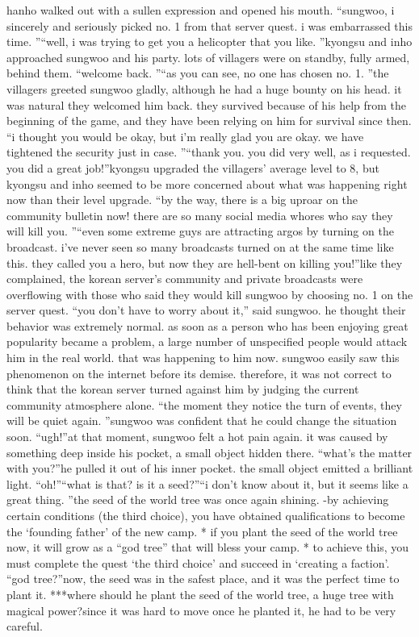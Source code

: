 hanho walked out with a sullen expression and opened his mouth.
“sungwoo, i sincerely and seriously picked no.
 1 from that server quest.
 i was embarrassed this time.
”“well, i was trying to get you a helicopter that you like.
”kyongsu and inho approached sungwoo and his party.
lots of villagers were on standby, fully armed, behind them.
“welcome back.
”“as you can see, no one has chosen no.
 1.
”the villagers greeted sungwoo gladly, although he had a huge bounty on his head.
 it was natural they welcomed him back.
 they survived because of his help from the beginning of the game, and they have been relying on him for survival since then.
“i thought you would be okay, but i’m really glad you are okay.
 we have tightened the security just in case.
”“thank you.
 you did very well, as i requested.
 you did a great job!”kyongsu upgraded the villagers’ average level to 8, but kyongsu and inho seemed to be more concerned about what was happening right now than their level upgrade.
“by the way, there is a big uproar on the community bulletin now! there are so many social media whores who say they will kill you.
”“even some extreme guys are attracting argos by turning on the broadcast.
 i’ve never seen so many broadcasts turned on at the same time like this.
 they called you a hero, but now they are hell-bent on killing you!”like they complained, the korean server’s community and private broadcasts were overflowing with those who said they would kill sungwoo by choosing no.
 1 on the server quest.
“you don’t have to worry about it,” said sungwoo.
he thought their behavior was extremely normal.
 as soon as a person who has been enjoying great popularity became a problem, a large number of unspecified people would attack him in the real world.
 that was happening to him now.
sungwoo easily saw this phenomenon on the internet before its demise.
 therefore, it was not correct to think that the korean server turned against him by judging the current community atmosphere alone.
“the moment they notice the turn of events, they will be quiet again.
”sungwoo was confident that he could change the situation soon.
“ugh!”at that moment, sungwoo felt a hot pain again.
 it was caused by something deep inside his pocket, a small object hidden there.
“what’s the matter with you?”he pulled it out of his inner pocket.
the small object emitted a brilliant light.
“oh!”“what is that? is it a seed?”“i don’t know about it, but it seems like a great thing.
”the seed of the world tree was once again shining.
-by achieving certain conditions (the third choice), you have obtained qualifications to become the ‘founding father’ of the new camp.
* if you plant the seed of the world tree now, it will grow as a “god tree” that will bless your camp.
* to achieve this, you must complete the quest ‘the third choice’ and succeed in ‘creating a faction’.
“god tree?”now, the seed was in the safest place, and it was the perfect time to plant it.
***where should he plant the seed of the world tree, a huge tree with magical power?since it was hard to move once he planted it, he had to be very careful.


